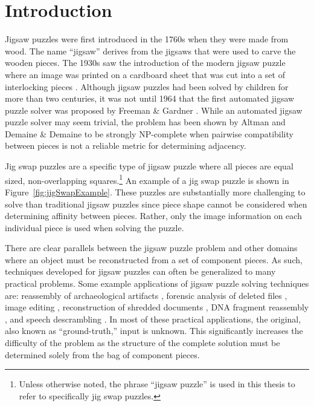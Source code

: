 \chapter{Introduction}\label{sec:introduction}

Jigsaw puzzles were first introduced in the 1760s when they were made from wood.  The name ``jigsaw'' derives from the jigsaws that were used to carve the wooden pieces.   The 1930s saw the introduction of the modern jigsaw puzzle where an image was printed on a cardboard sheet that was cut into a set of interlocking pieces \cite{williams1990, williams2004}.  Although jigsaw puzzles had been solved by children for more than two centuries, it was not until 1964 that the first automated jigsaw puzzle solver was proposed by Freeman \& Gardner \cite{freeman1964}.  While an automated jigsaw puzzle solver may seem trivial, the problem has been shown by Altman \cite{altman1990} and Demaine \& Demaine \cite{demaine2007} to be strongly NP-complete when pairwise compatibility between pieces is not a reliable metric for determining adjacency.

Jig swap puzzles are a specific type of jigsaw puzzle where all pieces are equal sized, non-overlapping squares.\footnote{Unless otherwise noted, the phrase ``jigsaw puzzle'' is used in this thesis to refer to specifically jig swap puzzles.}  An example of a jig swap puzzle is shown in Figure~\ref{fig:jigSwapExample}.  These puzzles are substantially more challenging to solve than traditional jigsaw puzzles since piece shape cannot be considered when determining affinity between pieces.  Rather, only the image information on each individual piece is used when solving the puzzle.

There are clear parallels between the jigsaw puzzle problem and other domains where an object must be reconstructed from a set of component pieces.  As such, techniques developed for jigsaw puzzles can often be generalized to many practical problems.  Some example applications of jigsaw puzzle solving techniques are: reassembly of archaeological artifacts \cite{brown2008, koller2006}, forensic analysis of deleted files \cite{garfinkel2010}, image editing \cite{cho2008}, reconstruction of shredded documents \cite{zhu2008}, DNA fragment reassembly \cite{marande2007}, and speech descrambling \cite{zhao2007}.  In most of these practical applications, the original, also known as ``ground-truth,'' input is unknown.  This significantly increases the difficulty of the problem as the structure of the complete solution must be determined solely from the bag of component pieces.

